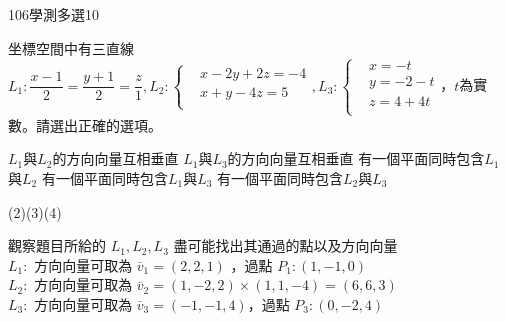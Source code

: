 \begin{QUESTIONS}
\begin{QUESTION}
\begin{QSOLLIST}
\begin{QSOL}
\begin{QSTEPS}
                \end{QSTEPS}
            \end{QSOL}            
        \end{QSOLLIST}
        \begin{QEMPTYSPACE}
        \end{QEMPTYSPACE}
    \end{QUESTION}
    \begin{QUESTION}
        \begin{ExamInfo}{106}{學測}{多選}{10}
        \end{ExamInfo}
        \begin{ExamAnsRateInfo}{43}{66}{39}{24}
        \end{ExamAnsRateInfo}
        \begin{QBODY}
            坐標空間中有三直線${{L}_{1}}:\dfrac{x-1}{2}=\dfrac{y+1}{2}=\dfrac{z}{1},{{L}_{2}}:\left\{ \begin{aligned}
			& x-2y+2z=-4 \\ 
			& x+y-4z=5 \\ 
			\end{aligned} \right.,{{L}_{3}}:\left\{ \begin{aligned}
			& x=-t \\ 
			& y=-2-t \\ 
			& z=4+4t \\ 
			\end{aligned} \right.$，$t$為實數。請選出正確的選項。
			\begin{QOPS}
				\QOP ${{L}_{1}}$與${{L}_{2}}$的方向向量互相垂直
				\QOP ${{L}_{1}}$與${{L}_{3}}$的方向向量互相垂直
				\QOP 有一個平面同時包含${{L}_{1}}$與${{L}_{2}}$
				\QOP 有一個平面同時包含${{L}_{1}}$與${{L}_{3}}$
				\QOP 有一個平面同時包含${{L}_{2}}$與${{L}_{3}}$
			\end{QOPS}
        \end{QBODY}
        \begin{QFROMS}
        \end{QFROMS}
        \begin{QTAGS}\end{QTAGS}
        \begin{QANS}
            (2)(3)(4)
        \end{QANS}
        \begin{QSOLLIST}
            \begin{QSOL}
                觀察題目所給的 $L_1,L_2,L_3$ 盡可能找出其通過的點以及方向向量\\
                $L_1:$ 方向向量可取為 $\lvec{v_1} = (2,2,1)$ ，過點 $P_1:(1,-1,0)$\\
                $L_2:$ 方向向量可取為 $\lvec{v_2} = (1,-2,2)\times(1,1,-4)=(6,6,3)$\\
                $L_3:$ 方向向量可取為 $\lvec{v_3} = (-1,-1, 4)$，過點 $P_3:(0,-2,4)$\\
                

\end{QSOL}
\end{QSOLLIST}
\end{QUESTION}
\end{QUESTIONS}
